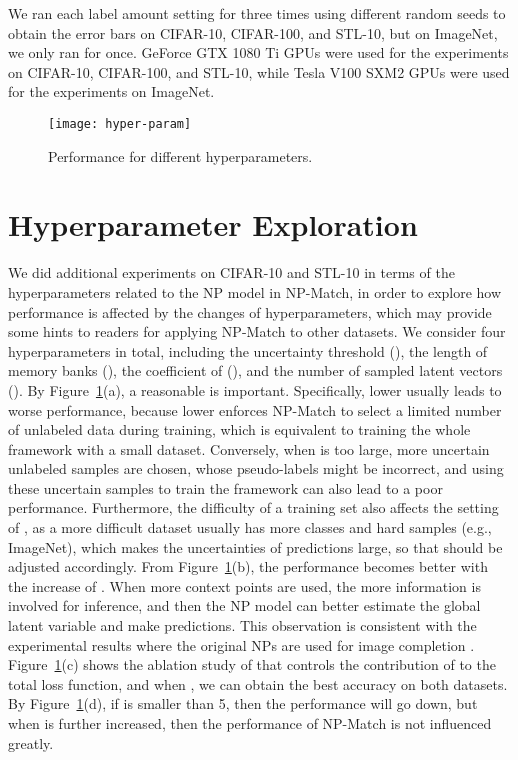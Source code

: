 \documentclass[nohyperref]{article}
\theoremstyle{plain}
\theoremstyle{definition}
\theoremstyle{remark}
\begin{document}
We ran each label amount setting for three times using different random seeds to obtain the error bars on CIFAR-10, CIFAR-100, and STL-10, but on ImageNet, we only ran for once. GeForce GTX 1080 Ti GPUs were used for the experiments on CIFAR-10, CIFAR-100, and STL-10, while Tesla V100 SXM2 GPUs were used for the experiments on ImageNet. 

\begin{figure}[t]
\centering
\texttt{[image: hyper-param]}
\vspace{-4ex}
\caption{Performance for different hyperparameters.} 
\label{fig:hyper}
\end{figure}

\section{Hyperparameter Exploration}
We did additional experiments on CIFAR-10 and STL-10 in terms of the hyperparameters related to the NP model in NP-Match, in order to explore how performance is affected by the changes of hyperparameters, which may provide some hints to readers for applying NP-Match to other datasets. We consider four hyperparameters in total, including the uncertainty threshold (), the length of memory banks (), the coefficient of  (), and the number of sampled latent vectors (). By Figure~\ref{fig:hyper}(a), a reasonable  is important. Specifically, lower  usually leads to worse performance, because lower  enforces NP-Match to select a limited number of unlabeled data during training, which is equivalent to training the whole framework with a small dataset. Conversely, when  is too large, more uncertain unlabeled samples are chosen, whose pseudo-labels might be incorrect, and using these uncertain samples to train the framework can also lead to a poor performance. Furthermore, the difficulty of a training set also affects the setting of , as a more difficult dataset usually has more classes and hard samples (e.g., ImageNet), which makes the uncertainties of predictions large, so that  should be adjusted accordingly. 
From Figure~\ref{fig:hyper}(b), the performance becomes better with the increase of . When more context points are used, the more information is involved for inference, and then the NP model can better estimate the global latent variable and make predictions. This observation is consistent with the experimental results where the original NPs are used for image completion \cite{garnelo2018neural}.  
Figure~\ref{fig:hyper}(c) shows the ablation study of  that controls the contribution of  to the total loss function, and when , we can obtain the best accuracy on both datasets. By  Figure~\ref{fig:hyper}(d), if  is smaller than 5, then the performance will go down, but when  is further increased, then the performance of NP-Match is not influenced greatly.
\end{document}
